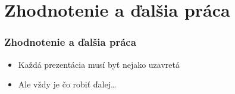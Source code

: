 \documentclass{beamer}
\begin{document}
\section*{Zhodnotenie a ďalšia práca}

\begin{frame}[fragile=singleslide]\frametitle{Zhodnotenie a ďalšia práca}
\begin{itemize}
\item Každá prezentácia musí byť nejako uzavretá
\item Ale vždy je čo robiť ďalej\ldots{}
\end{itemize}
\end{frame}
\end{document}
